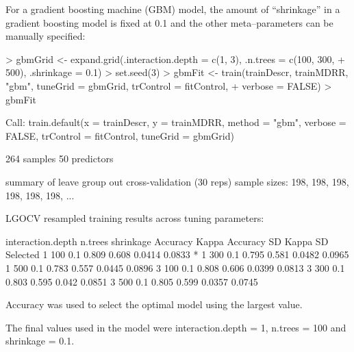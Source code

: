 \documentclass[12pt]{article}
\begin{document}
For a gradient boosting machine (GBM) model, the amount of ``shrinkage'' in a gradient boosting model is fixed at 0.1 and the other meta--parameters can be manually specified:
\begin{small}
\begin{landscape}

\begin{Schunk}
\begin{Sinput}
> gbmGrid <- expand.grid(.interaction.depth = c(1, 3), .n.trees = c(100, 300, 
+     500), .shrinkage = 0.1)
> set.seed(3)
> gbmFit <- train(trainDescr, trainMDRR, "gbm", tuneGrid = gbmGrid, trControl = fitControl, 
+     verbose = FALSE)
> gbmFit
\end{Sinput}
\begin{Soutput}
Call:
train.default(x = trainDescr, y = trainMDRR, method = "gbm", 
    verbose = FALSE, trControl = fitControl, tuneGrid = gbmGrid)

264 samples
50 predictors

summary of leave group out cross-validation (30 reps) sample sizes:
    198, 198, 198, 198, 198, 198, ... 

LGOCV resampled training results across tuning parameters:

  interaction.depth  n.trees  shrinkage  Accuracy  Kappa  Accuracy SD  Kappa SD  Selected
  1                  100      0.1        0.809     0.608  0.0414       0.0833    *       
  1                  300      0.1        0.795     0.581  0.0482       0.0965            
  1                  500      0.1        0.783     0.557  0.0445       0.0896            
  3                  100      0.1        0.808     0.606  0.0399       0.0813            
  3                  300      0.1        0.803     0.595  0.042        0.0851            
  3                  500      0.1        0.805     0.599  0.0357       0.0745            

Accuracy was used to select the optimal model using the largest value.

The final values used in the model were interaction.depth = 1, n.trees = 100 and shrinkage = 0.1.
\end{Soutput}
\end{Schunk}

\end{landscape}
\end{small}
\end{document}
